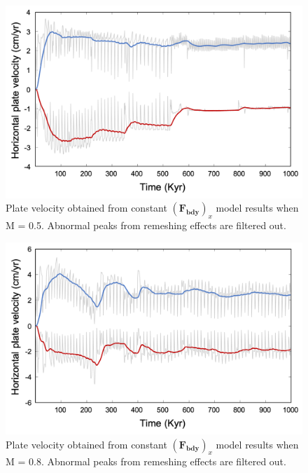 \documentclass[letterpaper,12pt,notitle]{memphisthesis}                     %
\begin{document}
\begin{figure}[!htb]
	\centering
	\includegraphics[width=0.9\linewidth]{./figs/m05vel.png}
	\caption{Plate velocity obtained from constant $(\boldsymbol{F_{bdy}})_x$ model results when M = 0.5. Abnormal peaks from remeshing effects are filtered out.}
	\label{fig:m05vel}
\end{figure}



\begin{figure}[!htb]
	\centering
	\includegraphics[width=0.9\linewidth]{./figs/m08vel.png}
	\caption{Plate velocity obtained from constant $(\boldsymbol{F_{bdy}})_x$ model results when M = 0.8. Abnormal peaks from remeshing effects are filtered out.} 
	\label{fig:m08vel}
\end{figure}
\end{document}
